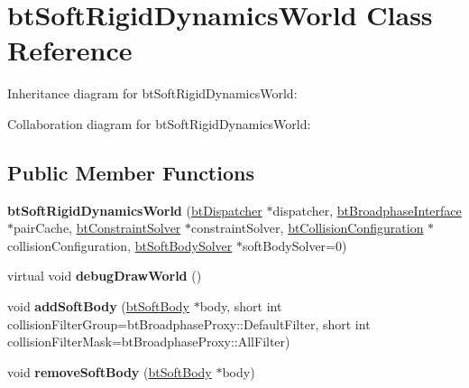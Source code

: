 \hypertarget{classbt_soft_rigid_dynamics_world}{\section{bt\+Soft\+Rigid\+Dynamics\+World Class Reference}
\label{classbt_soft_rigid_dynamics_world}
}


Inheritance diagram for bt\+Soft\+Rigid\+Dynamics\+World\+:


Collaboration diagram for bt\+Soft\+Rigid\+Dynamics\+World\+:
\subsection*{Public Member Functions}
\begin{DoxyCompactItemize}
\item 
\hypertarget{classbt_soft_rigid_dynamics_world_ad3724ef1193391fe522edc96c541ac9c}{{\bfseries bt\+Soft\+Rigid\+Dynamics\+World} (\hyperlink{classbt_dispatcher}{bt\+Dispatcher} $\ast$dispatcher, \hyperlink{classbt_broadphase_interface}{bt\+Broadphase\+Interface} $\ast$pair\+Cache, \hyperlink{classbt_constraint_solver}{bt\+Constraint\+Solver} $\ast$constraint\+Solver, \hyperlink{classbt_collision_configuration}{bt\+Collision\+Configuration} $\ast$collision\+Configuration, \hyperlink{classbt_soft_body_solver}{bt\+Soft\+Body\+Solver} $\ast$soft\+Body\+Solver=0)}\label{classbt_soft_rigid_dynamics_world_ad3724ef1193391fe522edc96c541ac9c}

\item 
\hypertarget{classbt_soft_rigid_dynamics_world_a4f4f35e55b213306488d9b57a30271a3}{virtual void {\bfseries debug\+Draw\+World} ()}\label{classbt_soft_rigid_dynamics_world_a4f4f35e55b213306488d9b57a30271a3}

\item 
\hypertarget{classbt_soft_rigid_dynamics_world_aa20faacb10b1d67a6b79e19a3709da65}{void {\bfseries add\+Soft\+Body} (\hyperlink{classbt_soft_body}{bt\+Soft\+Body} $\ast$body, short int collision\+Filter\+Group=bt\+Broadphase\+Proxy\+::\+Default\+Filter, short int collision\+Filter\+Mask=bt\+Broadphase\+Proxy\+::\+All\+Filter)}\label{classbt_soft_rigid_dynamics_world_aa20faacb10b1d67a6b79e19a3709da65}

\item 
\hypertarget{classbt_soft_rigid_dynamics_world_a4129564060bc4960f509ebf31470686a}{void {\bfseries remove\+Soft\+Body} (\hyperlink{classbt_soft_body}{bt\+Soft\+Body} $\ast$body)}\label{classbt_soft_rigid_dynamics_world_a4129564060bc4960f509ebf31470686a}


\end{DoxyCompactItemize}
